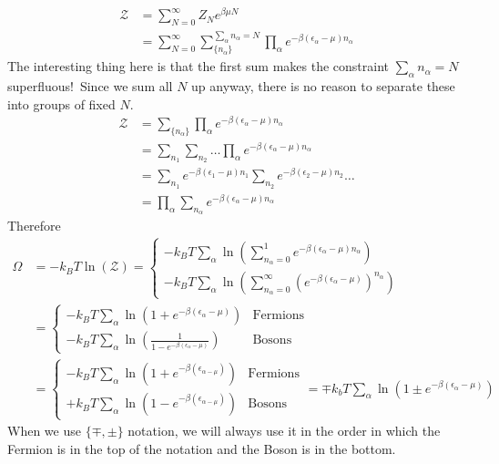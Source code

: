 \documentclass[a4paper,twoside,master.tex]{subfiles}
\begin{document}
\begin{align}
    \mathcal{Z} &= \sum_{N=0}^{\infty} Z_N e^{\beta \mu N} \\
    &= \sum_{N=0}^{\infty} \sum_{\{n_{\alpha}\}}^{\sum_{\alpha} n_{\alpha} = N} \prod_{\alpha} e^{- \beta (\epsilon_{\alpha} - \mu) n_{\alpha}}
\end{align}
The interesting thing here is that the first sum makes the constraint $ \sum_{\alpha} n_{\alpha} = N $ superfluous!\ Since we sum all $ N $ up anyway, there is no reason to separate these into groups of fixed $ N $.
\begin{align}
    \mathcal{Z} &= \sum_{\{n_{\alpha}\}} \prod_{\alpha} e^{- \beta (\epsilon_{\alpha} - \mu)n_{\alpha}} \\
    &= \sum_{n_1} \sum_{n_2} \ldots \prod_{\alpha} e^{- \beta (\epsilon_{\alpha} - \mu)n_{\alpha}} \\
    &= \sum_{n_1} e^{- \beta (\epsilon_1 - \mu)n_1} \sum_{n_2} e^{- \beta (\epsilon_2 - \mu)n_2} \ldots \\
    &= \prod_{\alpha} \sum_{n_{\alpha}} e^{- \beta (\epsilon_{\alpha} - \mu)n_{\alpha}}
\end{align}
Therefore
\begin{align}
    \Omega &= - k_B T \ln(\mathcal{Z}) = \begin{cases} - k_B T \sum_{\alpha} \ln(\sum_{n_{\alpha}=0}^{1} e^{- \beta (\epsilon_{\alpha} - \mu)n_{\alpha}}) \\ - k_B T \sum_{\alpha} \ln(\sum_{n_{\alpha} = 0}^{\infty} \left( e^{- \beta (\epsilon_{\alpha} - \mu)} \right)^{n_{\alpha}}) \end{cases} \\
    &= \begin{cases} - k_B T \sum_{\alpha} \ln(1 + e^{- \beta (\epsilon_{\alpha} - \mu)}) & \text{Fermions} \\ -k_B T \sum_{\alpha} \ln\left( \frac{1}{1 - e^{- \beta (\epsilon_{\alpha} - \mu)}} \right) & \text{Bosons} \end{cases} \\
    &= \begin{cases} - k_B T \sum_{\alpha} \ln(1 + e^{- \beta (\epsilon_{\alpha - \mu})}) & \text{Fermions} \\ + k_B T \sum_{\alpha} \ln(1 - e^{- \beta (\epsilon_{\alpha - \mu})}) & \text{Bosons} \end{cases} = \mp k_b T \sum_{\alpha} \ln(1 \pm e^{- \beta (\epsilon_{\alpha} - \mu)})
\end{align}
When we use $ \{\mp,\pm\} $ notation, we will always use it in the order in which the Fermion is in the top of the notation and the Boson is in the bottom.
\end{document}
